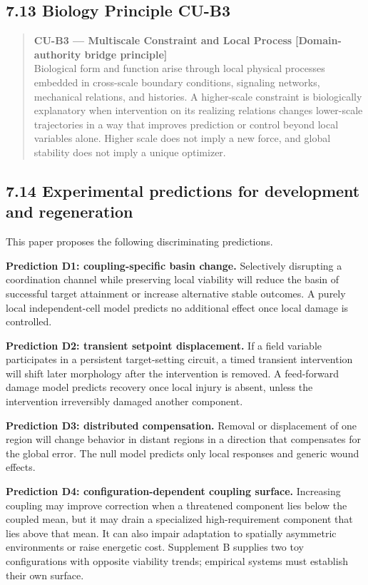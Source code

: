 \documentclass[
  11pt,
]{article}
\begin{document}
\subsection{7.13 Biology Principle CU-B3}\label{biology-principle-cu-b3}

\begin{quote}
\textbf{CU-B3 --- Multiscale Constraint and Local Process}
\textbf{{[}Domain-authority bridge principle{]}}\\
Biological form and function arise through local physical processes
embedded in cross-scale boundary conditions, signaling networks,
mechanical relations, and histories. A higher-scale constraint is
biologically explanatory when intervention on its realizing relations
changes lower-scale trajectories in a way that improves prediction or
control beyond local variables alone. Higher scale does not imply a new
force, and global stability does not imply a unique optimizer.
\end{quote}

\subsection{7.14 Experimental predictions for development and
regeneration}\label{experimental-predictions-for-development-and-regeneration}

This paper proposes the following discriminating predictions.

\textbf{Prediction D1: coupling-specific basin change.} Selectively
disrupting a coordination channel while preserving local viability will
reduce the basin of successful target attainment or increase alternative
stable outcomes. A purely local independent-cell model predicts no
additional effect once local damage is controlled.

\textbf{Prediction D2: transient setpoint displacement.} If a field
variable participates in a persistent target-setting circuit, a timed
transient intervention will shift later morphology after the
intervention is removed. A feed-forward damage model predicts recovery
once local injury is absent, unless the intervention irreversibly
damaged another component.

\textbf{Prediction D3: distributed compensation.} Removal or
displacement of one region will change behavior in distant regions in a
direction that compensates for the global error. The null model predicts
only local responses and generic wound effects.

\textbf{Prediction D4: configuration-dependent coupling surface.}
Increasing coupling may improve correction when a threatened component
lies below the coupled mean, but it may drain a specialized
high-requirement component that lies above that mean. It can also impair
adaptation to spatially asymmetric environments or raise energetic cost.
Supplement B supplies two toy configurations with opposite viability
trends; empirical systems must establish their own surface.
\end{document}
